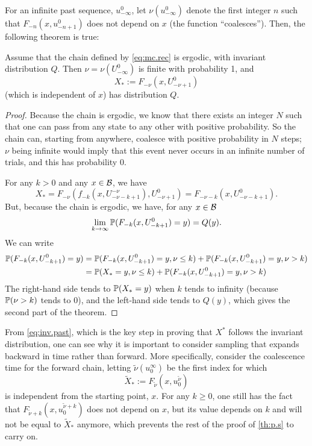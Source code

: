 For an infinite past sequence, $u_{-\infty}^0$, let $\nu(u_{-\infty}^0)$ denote the
first integer $n$ such that $F_{-n}(x, u_{-n+1}^0)$ does not depend on
$x$ (the function
``coalesces''). Then, the following theorem is true:
\begin{theorem}
\label{th:p.s}
Assume that the chain defined by \cref{eq:mc.rec} is
ergodic, with invariant distribution $Q$. Then $\nu = \nu(U_{-\infty}^0)$ is finite with probability 1,
and 
\begin{equation}
\label{eq:p.s}
X_*:= F_{-\nu}(x, U_{-\nu+1}^0)
\end{equation}
(which is independent of $x$) has distribution $Q$.
\end{theorem}
\begin{proof}
Because the  chain is ergodic, we know that there exists an integer
$N$ such that one can pass from any state to any other with positive
probability. So the chain can, starting from anywhere, coalesce with positive probability in
$N$ steps; $\nu$ being infinite would imply that this event never
occurs in an infinite number of trials, and this has probability 0.

For any $k>0$ and any $x\in{\mathcal B}$, we have
\begin{equation}
\label{eq:inv.past}
X_*= F_{-\nu}(f_{-k}(x, U_{-\nu-k+1}^{-\nu}), U_{-\nu+1}^0) = F_{-\nu-k}(x, U_{-\nu-k+1}^0).
\end{equation}
But, because the chain is ergodic, we have, for any $x\in{\mathcal B}$
$$
\lim_{k\to\infty} \bm{\mathbb P}(F_{-k}(x, U_{-k+1}^0) = y) = Q(y).
$$
We can write
\begin{align*}
\bm{\mathbb P}(F_{-k}(x, U_{-k+1}^0) = y) 
& = \bm{\mathbb P}(F_{-k}(x, U_{-k+1}^0) = y, \nu\leq k) + \bm{\mathbb P}(F_{-k}(x, U_{-k+1}^0) = y, \nu> k)\\
& = \bm{\mathbb P}(X_* = y, \nu\leq k)
+ \bm{\mathbb P}(F_{-k}(x, U_{-k+1}^0) = y, \nu> k)
\end{align*}
The right-hand side tends to $\bm{\mathbb P}(X_* = y)$ when $k$ tends to infinity
(because $\bm{\mathbb P}(\nu>k)$ tends to 0), and the left-hand side tends to
$Q(y)$, which gives the second part of the theorem.
\end{proof}

From  \cref{eq:inv.past}, which is the key step in proving
that $X^*$ follows the invariant distribution, one can see why it is
important to consider sampling that expands backward in time rather
than forward. More specifically, consider the coalescence
time for the forward chain, letting
$\tilde\nu(u_0^\infty)$ be the first index for which 
\[
\tilde X_* := F_{\tilde\nu}(x, u_0^{\tilde\nu})
\]
is independent from the starting point, $x$. For any $k\geq 0$, one
still has the fact that  $F_{\tilde\nu+k}(x, u_0^{\tilde\nu+k})$ does
not depend on $x$, but its value depends on $k$ and will not be equal
to $\tilde X_*$ anymore, which  prevents the rest of the proof of 
 \cref{th:p.s} to carry on. 


